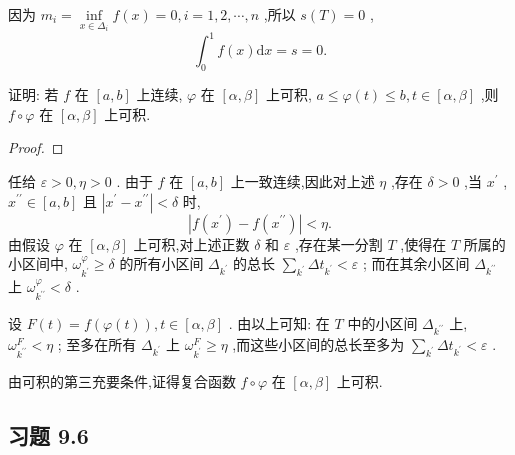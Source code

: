 因为 \({m}_{i} = \mathop{\inf }\limits_{{x \in  {\Delta }_{i}}}f\left( x\right)  = 0,i = 1,2,\cdots ,n\) ,所以 \(s\left( T\right)  = 0\) ,
\[
{\int }_{0}^{1}f\left( x\right) \mathrm{d}x = s = 0.
\]
\begin{example}

\end{example}
证明: 若 \(f\) 在 \(\left\lbrack  {a,b}\right\rbrack\) 上连续, \(\varphi\) 在 \(\left\lbrack  {\alpha ,\beta }\right\rbrack\) 上可积, \(a \leq  \varphi \left( t\right)  \leq  b,t \in  \left\lbrack  {\alpha ,\beta }\right\rbrack\) ,则 \(f \circ  \varphi\) 在 \(\left\lbrack  {\alpha ,\beta }\right\rbrack\) 上可积.

\begin{proof}

\end{proof}
任给 \(\varepsilon  > 0,\eta  > 0\) . 由于 \(f\) 在 \(\left\lbrack  {a,b}\right\rbrack\) 上一致连续,因此对上述 \(\eta\) ,存在 \(\delta  > 0\) ,当 \({x}^{\prime }\) , \({x}^{\prime \prime } \in  \left\lbrack  {a,b}\right\rbrack\) 且 \(\left| {{x}^{\prime } - {x}^{\prime \prime }}\right|  < \delta\) 时,
\[
\left| {f\left( {x}^{\prime }\right)  - f\left( {x}^{\prime \prime }\right) }\right|  < \eta .
\]
由假设 \(\varphi\) 在 \(\left\lbrack  {\alpha ,\beta }\right\rbrack\) 上可积,对上述正数 \(\delta\) 和 \(\varepsilon\) ,存在某一分割 \(T\) ,使得在 \(T\) 所属的小区间中, \({\omega }_{{k}^{\prime }}^{\varphi } \geq  \delta\) 的所有小区间 \({\Delta }_{{k}^{\prime }}\) 的总长 \(\mathop{\sum }\limits_{{k}^{\prime }}\Delta {t}_{{k}^{\prime }} < \varepsilon\) ; 而在其余小区间 \({\Delta }_{{k}^{\prime \prime }}\) 上 \({\omega }_{{k}^{\prime \prime }}^{\varphi } < \delta\) .

设 \(F\left( t\right)  = f\left( {\varphi \left( t\right) }\right) ,t \in  \left\lbrack  {\alpha ,\beta }\right\rbrack\) . 由以上可知: 在 \(T\) 中的小区间 \({\Delta }_{{k}^{\prime \prime }}\) 上, \({\omega }_{{k}^{\prime \prime }}^{F} < \eta\) ; 至多在所有 \({\Delta }_{{k}^{\prime }}\) 上 \({\omega }_{{k}^{\prime }}^{F} \geq  \eta\) ,而这些小区间的总长至多为 \(\mathop{\sum }\limits_{{k}^{\prime }}\Delta {t}_{{k}^{\prime }} < \varepsilon\) .

由可积的第三充要条件,证得复合函数 \(f \circ  \varphi\) 在 \(\left\lbrack  {\alpha ,\beta }\right\rbrack\) 上可积.

\subsection{习题 9.6}

